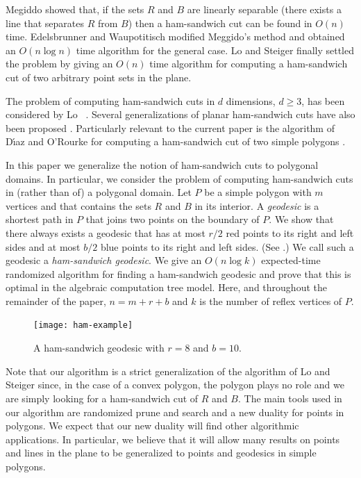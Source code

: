 \documentclass[charterfonts,lotsofwhite]{patmorin}
\begin{document}
Megiddo \cite{m85} showed that, if the sets $R$ and $B$ are linearly
separable (there exists a line that separates $R$ from $B$) then a
ham-sandwich cut can be found in $O(n)$ time.  Edelsbrunner and
Waupotitisch \cite{ew86} modified Meggido's method and obtained an
$O(n\log n)$ time algorithm for the general case.  Lo and Steiger
\cite{ls90} finally settled the problem by giving an $O(n)$ time
algorithm for computing a ham-sandwich cut of two arbitrary point sets
in the plane.

The problem of computing ham-sandwich cuts in $d$ dimensions, $d\ge
3$, has been considered by Lo \etal\ \cite{lms94}.  Several
generalizations of planar ham-sandwich cuts have also been proposed
\cite{anru98,bks00,bl05,iuy98a,iuy98b}. Particularly relevant to the
current paper is the algorithm of D{\'\i}az and O'Rourke for computing
a ham-sandwich cut of two simple polygons \cite{do90}. 

In this paper we generalize the notion of ham-sandwich cuts to
polygonal domains.  In particular, we consider the problem of
computing ham-sandwich cuts in (rather than of) a polygonal domain.
Let $P$ be a simple polygon with $m$ vertices and that contains the
sets $R$ and $B$ in its interior.  A \emph{geodesic} is a shortest
path in $P$ that joins two points on the boundary of $P$.  We show
that there always exists a geodesic that has at most $r/2$ red points
to its right and left sides and at most $b/2$ blue points to its right
and left sides.  (See .) We call such a geodesic a
\emph{ham-sandwich geodesic}.  We give an $O(n\log k)$ expected-time
randomized algorithm for finding a ham-sandwich geodesic and prove
that this is optimal in the algebraic computation tree model.  Here,
and throughout the remainder of the paper, $n=m+r+b$ and $k$ is the
number of reflex vertices of $P$.

\begin{figure}[htbp]
\begin{center}
\texttt{[image: ham-example]}
\end{center}
\caption{A ham-sandwich geodesic with $r=8$ and $b=10$.}
\end{figure}


Note that our algorithm is a strict generalization of the algorithm of
Lo and Steiger since, in the case of a convex polygon, the polygon
plays no role and we are simply looking for a ham-sandwich cut of $R$
and $B$.  The main tools used in our algorithm are randomized prune
and search \cite{m83} and a new duality for points in polygons.  We
expect that our new duality will find other algorithmic applications.
In particular, we believe that it will allow many results on points
and lines in the plane to be generalized to points and geodesics in
simple polygons.
\end{document}
